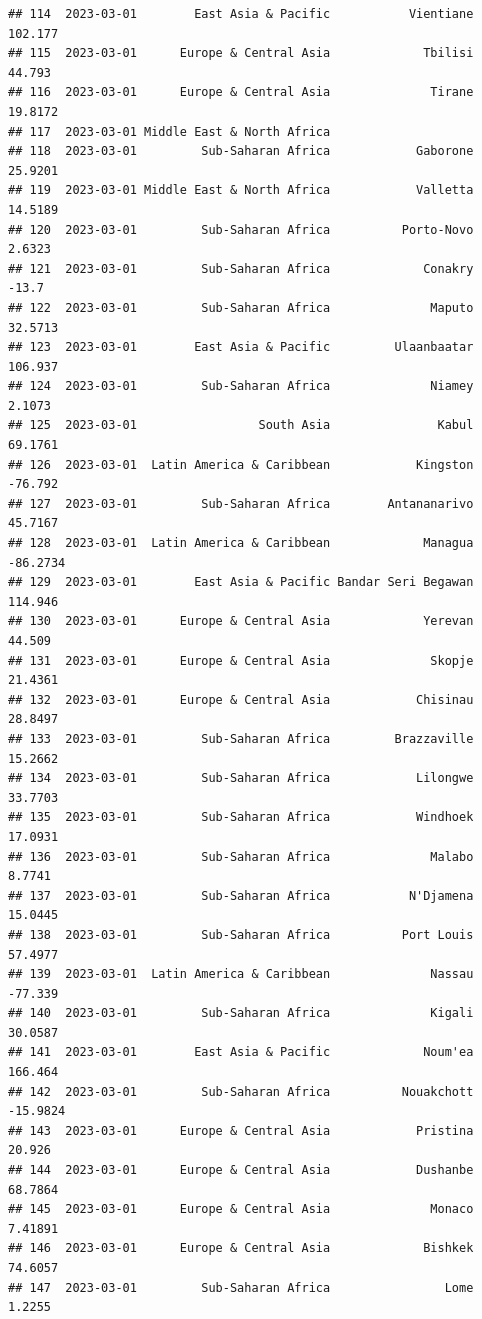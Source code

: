 \documentclass[
]{article}
\begin{document}
\begin{verbatim}
## 114  2023-03-01        East Asia & Pacific           Vientiane    102.177
## 115  2023-03-01      Europe & Central Asia             Tbilisi     44.793
## 116  2023-03-01      Europe & Central Asia              Tirane    19.8172
## 117  2023-03-01 Middle East & North Africa                               
## 118  2023-03-01         Sub-Saharan Africa            Gaborone    25.9201
## 119  2023-03-01 Middle East & North Africa            Valletta    14.5189
## 120  2023-03-01         Sub-Saharan Africa          Porto-Novo     2.6323
## 121  2023-03-01         Sub-Saharan Africa             Conakry      -13.7
## 122  2023-03-01         Sub-Saharan Africa              Maputo    32.5713
## 123  2023-03-01        East Asia & Pacific         Ulaanbaatar    106.937
## 124  2023-03-01         Sub-Saharan Africa              Niamey     2.1073
## 125  2023-03-01                 South Asia               Kabul    69.1761
## 126  2023-03-01  Latin America & Caribbean            Kingston    -76.792
## 127  2023-03-01         Sub-Saharan Africa        Antananarivo    45.7167
## 128  2023-03-01  Latin America & Caribbean             Managua   -86.2734
## 129  2023-03-01        East Asia & Pacific Bandar Seri Begawan    114.946
## 130  2023-03-01      Europe & Central Asia             Yerevan     44.509
## 131  2023-03-01      Europe & Central Asia              Skopje    21.4361
## 132  2023-03-01      Europe & Central Asia            Chisinau    28.8497
## 133  2023-03-01         Sub-Saharan Africa         Brazzaville    15.2662
## 134  2023-03-01         Sub-Saharan Africa            Lilongwe    33.7703
## 135  2023-03-01         Sub-Saharan Africa            Windhoek    17.0931
## 136  2023-03-01         Sub-Saharan Africa              Malabo     8.7741
## 137  2023-03-01         Sub-Saharan Africa           N'Djamena    15.0445
## 138  2023-03-01         Sub-Saharan Africa          Port Louis    57.4977
## 139  2023-03-01  Latin America & Caribbean              Nassau    -77.339
## 140  2023-03-01         Sub-Saharan Africa              Kigali    30.0587
## 141  2023-03-01        East Asia & Pacific             Noum'ea    166.464
## 142  2023-03-01         Sub-Saharan Africa          Nouakchott   -15.9824
## 143  2023-03-01      Europe & Central Asia            Pristina     20.926
## 144  2023-03-01      Europe & Central Asia            Dushanbe    68.7864
## 145  2023-03-01      Europe & Central Asia              Monaco    7.41891
## 146  2023-03-01      Europe & Central Asia             Bishkek    74.6057
## 147  2023-03-01         Sub-Saharan Africa                Lome     1.2255

\end{verbatim}
\end{document}
